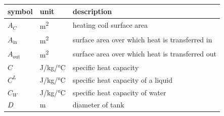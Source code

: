 \documentclass[12pt]{article}
\begin{document}
\renewcommand{\arraystretch}{1.2}
\noindent \begin{longtable*}{l l p{12cm}} \toprule
  \textbf{symbol} & \textbf{unit} & \textbf{description}\\
  \midrule 
  $A_C$ & \si[per-mode=symbol] {\square\metre} & heating coil surface area
  \\
  $A_\text{in}$ & \si[per-mode=symbol] {\square\metre} & surface area over 
  which heat is transferred in
  \\ 
  $A_\text{out}$ & \si[per-mode=symbol] {\square\metre} & surface area over 
  which heat is transferred out
  \\ 
  $C$ & \si[per-mode=symbol] {\joule\per \kilogram\per \celsius} &
  specific heat capacity
  \\
  $C^L$ & \si[per-mode=symbol] {\joule\per\kilo\gram\per\celsius} & specific 
  heat capacity of a liquid 
  \\ 
  $C_W$ & \si[per-mode=symbol] {\joule\per \kilogram\per \celsius} & specific
  heat capacity of water
  \\  
  $D$ & \si{\metre} & diameter of tank
  \\

\end{longtable*}
\end{document}
